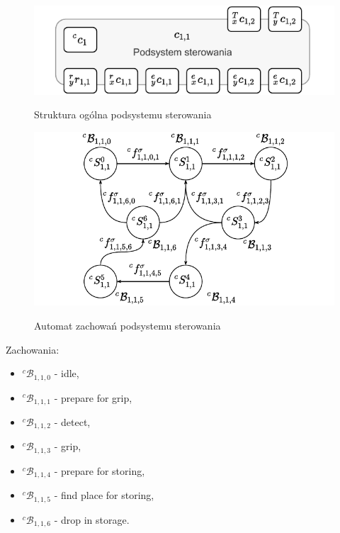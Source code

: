 \begin{figure}
    \centering
    \includegraphics[width=\columnwidth]{figures/ISR-cs-model.pdf}
    \label{fig:model-cs}
    \caption{Struktura ogólna podsystemu sterowania}
\end{figure}

\begin{figure}
    \centering
    \includegraphics[width=\columnwidth]{figures/ISR-cs-behaviours.pdf}
    \label{fig:zachowania-cs}
    \caption{Automat zachowań podsystemu sterowania}
\end{figure}

Zachowania:
\begin{itemize}
    \item ${}^{c}\mathcal{B}_{1,1,0}$ - idle,
    \item ${}^{c}\mathcal{B}_{1,1,1}$ - prepare for grip,
    \item ${}^{c}\mathcal{B}_{1,1,2}$ - detect,
    \item ${}^{c}\mathcal{B}_{1,1,3}$ - grip,
    \item ${}^{c}\mathcal{B}_{1,1,4}$ - prepare for storing,
    \item ${}^{c}\mathcal{B}_{1,1,5}$ - find place for storing,
    \item ${}^{c}\mathcal{B}_{1,1,6}$ - drop in storage.
\end{itemize}
